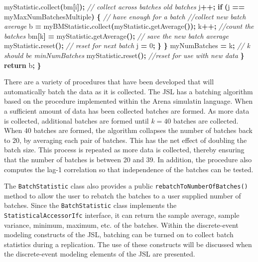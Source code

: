 \documentclass[
]{book}
\newenvironment{Shaded}{\begin{snugshade}}{\end{snugshade}}
\newcommand{\CommentTok}[1]{\textcolor[rgb]{0.56,0.35,0.01}{\textit{#1}}}
\newcommand{\ControlFlowTok}[1]{\textcolor[rgb]{0.13,0.29,0.53}{\textbf{#1}}}
\newcommand{\DecValTok}[1]{\textcolor[rgb]{0.00,0.00,0.81}{#1}}
\newcommand{\FunctionTok}[1]{\textcolor[rgb]{0.00,0.00,0.00}{#1}}
\newcommand{\NormalTok}[1]{#1}
\newcommand{\OperatorTok}[1]{\textcolor[rgb]{0.81,0.36,0.00}{\textbf{#1}}}
\theoremstyle{definition}
\theoremstyle{definition}
\theoremstyle{definition}
\theoremstyle{definition}
\theoremstyle{remark}
\begin{document}
\begin{Shaded}
\begin{Highlighting}[]
\NormalTok{            myStatistic}\OperatorTok{.}\FunctionTok{collect}\OperatorTok{(}\NormalTok{bm}\OperatorTok{[}\NormalTok{i}\OperatorTok{]);} \CommentTok{// collect across batches old batches}
\NormalTok{            j}\OperatorTok{++;}
            \ControlFlowTok{if} \OperatorTok{(}\NormalTok{j }\OperatorTok{==}\NormalTok{ myMaxNumBatchesMultiple}\OperatorTok{)} \OperatorTok{\{} \CommentTok{// have enough for a batch}
                \CommentTok{//collect new batch average}
\NormalTok{                b }\OperatorTok{=}\NormalTok{ myBMStatistic}\OperatorTok{.}\FunctionTok{collect}\OperatorTok{(}\NormalTok{myStatistic}\OperatorTok{.}\FunctionTok{getAverage}\OperatorTok{());}
\NormalTok{                k}\OperatorTok{++;} \CommentTok{//count the batches}
\NormalTok{                bm}\OperatorTok{[}\NormalTok{k}\OperatorTok{]} \OperatorTok{=}\NormalTok{ myStatistic}\OperatorTok{.}\FunctionTok{getAverage}\OperatorTok{();} \CommentTok{// save the new batch average}
\NormalTok{                myStatistic}\OperatorTok{.}\FunctionTok{reset}\OperatorTok{();} \CommentTok{// reset for next batch}
\NormalTok{                j }\OperatorTok{=} \DecValTok{0}\OperatorTok{;}
            \OperatorTok{\}}
        \OperatorTok{\}}
\NormalTok{        myNumBatches }\OperatorTok{=}\NormalTok{ k}\OperatorTok{;} \CommentTok{// k should be minNumBatches}
\NormalTok{        myStatistic}\OperatorTok{.}\FunctionTok{reset}\OperatorTok{();} \CommentTok{//reset for use with new data}
    \OperatorTok{\}}
    \ControlFlowTok{return}\NormalTok{ b}\OperatorTok{;}
\OperatorTok{\}}
\end{Highlighting}
\end{Shaded}

There are a variety of procedures that have been developed that will automatically batch the data as it is collected. The JSL has a batching algorithm based on the procedure implemented within the Arena simulatin language. When a sufficient amount of data has been collected batches are formed. As more data is collected, additional batches are formed until \(k=40\) batches are collected. When 40 batches are formed, the algorithm collapses the number of batches back to 20, by averaging each pair of batches. This has the net effect of doubling the batch size. This process is repeated as more data is collected, thereby ensuring that the number of batches is between 20 and 39. In addition, the procedure also computes the lag-1 correlation so that independence of the batches can be tested.

The \texttt{BatchStatistic} class also provides a public \texttt{rebatchToNumberOfBatches()} method to allow the user to rebatch the batches to a user supplied number of batches. Since the \texttt{BatchStatistic} class implements the \texttt{StatisticalAccessorIfc} interface, it can return the sample average, sample variance, minimum, maximum, etc. of the batches. Within the discrete-event modeling constructs of the JSL, batching can be turned on to collect batch statistics during a replication. The use of these constructs will be discussed when the discrete-event modeling elements of the JSL are presented.
\end{document}
